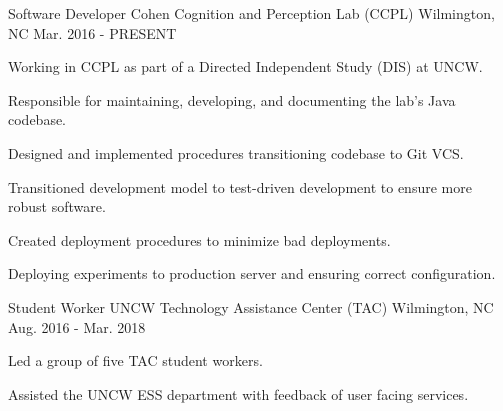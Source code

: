 

\begin{cventries}
  \cventry
    {Software Developer} %
    {Cohen Cognition and Perception Lab (CCPL)} %
    {Wilmington, NC} %
    {Mar. 2016 - PRESENT} %
    {
      \begin{cvitems}
        \item {Working in CCPL as part of a Directed Independent Study (DIS) at UNCW.}
        \item {Responsible for maintaining, developing, and documenting the lab's Java codebase.}
        \item {Designed and implemented procedures transitioning codebase to Git VCS.}
        \item {Transitioned development model to test-driven development to ensure more robust software.}
        \item {Created deployment procedures to minimize bad deployments.}
        \item {Deploying experiments to production server and ensuring correct configuration.}
      \end{cvitems}
    }
  \cventry
    {Student Worker}
    {UNCW Technology Assistance Center (TAC)} %
    {Wilmington, NC} %
    {Aug. 2016 - Mar. 2018} %
    {
      \begin{cvsubentries}
        {
          \begin{cvsubitems}
            \item {Led a group of five TAC student workers.}
            \item {Assisted the UNCW ESS department with feedback of user facing services.}
          \end{cvsubitems}
        }

\end{cvsubentries}}
\end{cventries}

